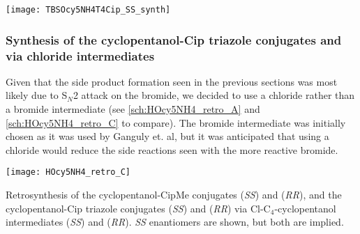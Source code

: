 \begin{scheme}[H]
	\begin{center}
		\texttt{[image: TBSOcy5NH4T4Cip\_SS\_synth]}
		\caption{Synthesis of the (\textit{SS})-TBDMS-cyclopentanol-Cip triazole conjugate .
		a) , sodium ascorbate, THPTA, , \textit{t}-BuOH, r.t., 87.4 \%. %
		b) TBAF, THF, r.t., 16 h. %
		\label{sch:TBSOcy5NH4T4Cip_SS_synth}}
	\end{center}
\end{scheme}

\subsubsection{Synthesis of the cyclopentanol-Cip triazole conjugates  and  via chloride intermediates\label{sec:Cl4Cl}}


Given that the side product formation seen in the previous sections was most likely due to S$_N$2 attack on the bromide, we decided to use a chloride rather than a bromide intermediate (see \ref{sch:HOcy5NH4_retro_A} and \ref{sch:HOcy5NH4_retro_C} to compare). The bromide intermediate was initially chosen as it was used by Ganguly et. al\cite{Ganguly2011}, but it was anticipated that using a chloride would reduce the side reactions seen with the more reactive bromide.

\begin{scheme}[H]
	\begin{center}
		\texttt{[image: HOcy5NH4\_retro\_C]}
		\caption{Retrosynthesis of the cyclopentanol-CipMe conjugates 
		 (\textit{SS}) and
		 (\textit{RR}), 
		and the cyclopentanol-Cip triazole conjugates 
		 (\textit{SS}) and
		 (\textit{RR})  
		via Cl-C$_4$-cyclopentanol intermediates 
		 (\textit{SS}) and 
		 (\textit{RR}). 
		\textit{SS} enantiomers are shown, but both are implied.
		\label{sch:HOcy5NH4_retro_C}}
	\end{center}
\end{scheme}


